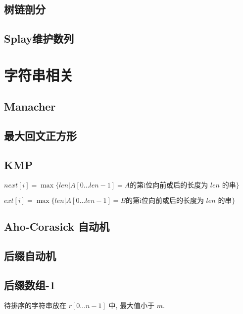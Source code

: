 \documentclass[landscape, twocolumn, 8pt, a4paper, twoside]{extarticle}
\begin{document}
\subsection{树链剖分}


\subsection{Splay维护数列}


\section{字符串相关}
\subsection{Manacher}


\subsection{最大回文正方形}


\subsection{KMP}
$next[i] = \max\{len | A[0 \ldots len - 1] = A \textrm{的第i位向前或后的长度为 $len$ 的串} \}$

$ext[i] = \max\{len | A[0 \ldots len - 1] = B \textrm{的第i位向前或后的长度为 $len$ 的串} \}$


\subsection{Aho-Corasick 自动机}


\subsection{后缀自动机}


\subsection{后缀数组-1}
待排序的字符串放在 $r[0 \ldots n - 1]$ 中, 最大值小于 $m$.
\end{document}
